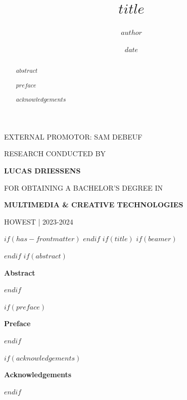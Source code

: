 \documentclass{article}
\begin{document}
\begin{titlepage}
\begin{adjustwidth}{1.5cm}{1.5cm}
    \MakeUppercase{External promotor: Sam Debeuf}

    \vspace{1em}

    \MakeUppercase{\small{Research conducted by}}

    \MakeUppercase{\Large\textbf{{Lucas Driessens}}}

    \MakeUppercase{\small{for obtaining a bachelor's degree in}}

    \MakeUppercase{\Large{\textbf{{Multimedia \& Creative Technologies}}}}

    \MakeUppercase{Howest | 2023-2024}
    \end{adjustwidth}
    \restoregeometry
\end{titlepage}

\title{$title$}
\author{$author$}
\date{$date$}

$if(has-frontmatter)$
\frontmatter
$endif$
$if(title)$
$if(beamer)$
\frame{\titlepage}
{} %

$endif$
$if(abstract)$
\begin{center}
 {\LARGE \textbf{\textsf{Abstract}}}
\end{center}

\begin{abstract}
\begin{justify}
$abstract$
\end{justify}
\end{abstract}
\pagebreak
$endif$


$if(preface)$
\begin{center}
 {\LARGE \textbf{\textsf{Preface}}}
\end{center}

\begin{abstract}
\begin{justify}
$preface$
\end{justify}
\end{abstract}
\pagebreak
$endif$



$if(acknowledgements)$
\begin{center}
 {\LARGE \textbf{\textsf{Acknowledgements}}}
\end{center}

\begin{abstract}
\begin{justify}
$acknowledgements$
\end{justify}
\end{abstract}
\pagebreak
$endif$
\end{document}
